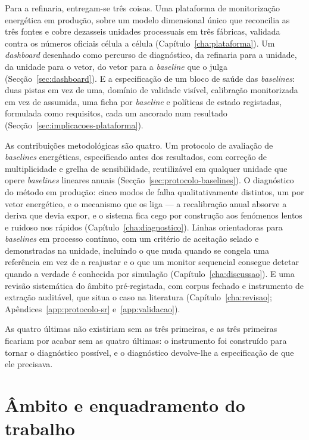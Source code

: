 Para a refinaria, entregam-se três coisas. Uma plataforma de
monitorização energética em produção, sobre um modelo dimensional único
que reconcilia as três fontes e cobre dezasseis unidades processuais em
três fábricas, validada contra os números oficiais célula a célula
(Capítulo~\ref{cha:plataforma}). Um \emph{dashboard} desenhado como
percurso de diagnóstico, da refinaria para a unidade, da unidade para o
vetor, do vetor para a \emph{baseline} que o julga
(Secção~\ref{sec:dashboard}). E a especificação de um bloco de saúde das
\emph{baselines}: duas pistas em vez de uma, domínio de validade
visível, calibração monitorizada em vez de assumida, uma ficha por
\emph{baseline} e políticas de estado registadas, formulada como
requisitos, cada um ancorado num resultado
(Secção~\ref{sec:implicacoes-plataforma}).

As contribuições metodológicas são quatro. Um protocolo de avaliação de
\emph{baselines} energéticas, especificado antes dos resultados, com
correção de multiplicidade e grelha de sensibilidade, reutilizável em
qualquer unidade que opere \emph{baselines} lineares anuais
(Secção~\ref{sec:protocolo-baselines}). O diagnóstico do método em
produção: cinco modos de falha qualitativamente distintos, um por vetor
energético, e o mecanismo que os liga --- a recalibração anual absorve a
deriva que devia expor, e o sistema fica cego por construção aos
fenómenos lentos e ruidoso nos rápidos (Capítulo~\ref{cha:diagnostico}).
Linhas orientadoras para \emph{baselines} em processo contínuo, com um
critério de aceitação selado e demonstradas na unidade, incluindo o que
muda quando se congela uma referência em vez de a reajustar e o que um
monitor sequencial consegue detetar quando a verdade é conhecida por
simulação (Capítulo~\ref{cha:discussao}). E uma revisão sistemática do
âmbito pré-registada, com corpus fechado e instrumento de extração
auditável, que situa o caso na literatura (Capítulo~\ref{cha:revisao};
Apêndices~\ref{app:protocolo-sr} e~\ref{app:validacao}).

As quatro últimas não existiriam sem as três primeiras, e as três
primeiras ficariam por acabar sem as quatro últimas: o instrumento foi
construído para tornar o diagnóstico possível, e o diagnóstico
devolve-lhe a especificação de que ele precisava.

\section{Âmbito e enquadramento do trabalho}
\label{sec:ambito}

